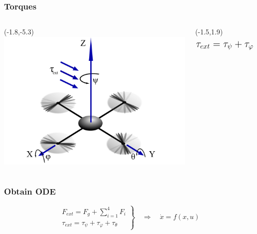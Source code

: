 \begin{frame}
		\frametitle{Torques}
			\begin{columns}[T] %
			\begin{column}{.7\textwidth}
				\begin{textblock}{0}(-1.8,-5.3)
					\includegraphics[width=11cm]{images/Copter_Text.pdf}
				\end{textblock}
			\end{column}
			\begin{column}{0.29\textwidth}
				\begin{textblock}{0}(-1.5,1.9)
					\[ \mathlarger{\mathlarger{\tau_{ext} = \tau_{\psi} +\tau_{\varphi}+\tau_{\theta}}} \]
				\end{textblock}
				\end{column}
		\end{columns}
\end{frame}

\begin{frame}
	\frametitle{Obtain ODE}
	\begin{block}{}
		\centering
		\[\left. \begin{array}{c} F_{ext} = F_{g} + \sum_{i=1}^{4}{F_{i}} \\ \tau_{ext} = \tau_{\psi} +\tau_{\varphi}+\tau_{\theta}  \end{array} \right\} \quad \Rightarrow \quad \dot{x}=f(x,u) \]
		\vspace{1ex}
	\end{block}
	
\end{frame}
